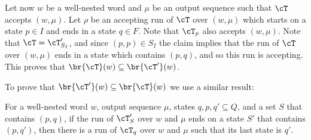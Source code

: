 Let now $w$ be a well-nested word and $\mu$ be an output sequence such that $\cT$ accepts $(w, \mu)$. Let $\rho$ be an accepting run of $\cT$ over $(w,\mu)$ which starts on a state $p\in I$ and ends in a state $q\in F$. Note that $\cT_p$ also accepts $(w,\mu)$. Note that $\cT = \cT'_{S_{I}}$, and since $(p,p)\in S_{I}$ the claim implies that the run of $\cT$ over $(w,\mu)$ ends in a state which contains $(p,q)$, and so this run is accepting. This proves that $\br{\cT}(w) \subseteq \br{\cT'}(w)$.


To prove that $\br{\cT'}(w) \subseteq \br{\cT}(w)$ we use a similar result:

\begin{claim}
	For a well-nested word $w$, output sequence $\mu$, states $q,p,q'\subseteq Q$, and a set $S$ that contains $(p,q)$, if the run of $\cT'_S$ over $w$ and $\mu$ ends on a state $S'$ that contains $(p,q')$, then there is a run of $\cT_q$ over $w$ and $\mu$ such that its last state is $q'$.
\end{claim}
